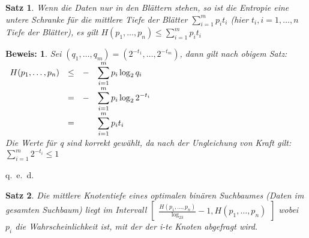 \documentclass[ngerman,draft,parskip=half*,twoside]{scrreprt}
\theoremstyle{break}
\newtheorem{satz}{Satz}[chapter]
\theoremstyle{nonumberbreak}
\newtheorem{beweis}{Beweis:}
\begin{document}
\begin{satz}
 Wenn die Daten nur in den Blättern stehen, so ist die Entropie eine untere Schranke für die mittlere Tiefe
 der Blätter $\sum_{i=1}^m p_i t_i$ (hier $t_i,i=1,\ldots,n$ Tiefe der Blätter), es gilt
 $H(p_1,\ldots,p_n)\leq\sum_{i=1}^m p_it_i$
\end{satz}
\begin{beweis}
Sei $(q_1,\ldots,q_m)=(2^{-t_1},\ldots,2^{-t_m})$, dann gilt nach obigem Satz:\\
$\begin{array}{cccl}
  H(p_1,\ldots,p_n) & \leq & - &\displaystyle\sum_{i=1}^m p_i\log_2q_i \vspace{0.3mm}\\
                 & =    & - &\displaystyle\sum_{i=1}^m p_i\log_22^{-t_i} \vspace{0.3mm}\\
                 & =    &   &\displaystyle\sum_{i=1}^m p_it_i \\
\end{array}$\\
Die Werte für q sind korrekt gewählt, da nach der Ungleichung von Kraft gilt: $\sum_{i=1}^m 2^{-t_i}\leq1$
\end{beweis}
\begin{flushright} q.~e.~d. \end{flushright}
\begin{satz}
Die mittlere Knotentiefe eines optimalen binären Suchbaumes (Daten im gesamten Suchbaum) liegt im Intervall $
\begin{bmatrix}
  \displaystyle\frac{ H(p_1,\ldots,p_n)}{\log_23}-1,H(p_1,\ldots,p_n)
\end{bmatrix}$
wobei $p_i$ die Wahrscheinlichkeit ist, mit der der i-te Knoten abgefragt wird.
\end{satz}
\end{document}
